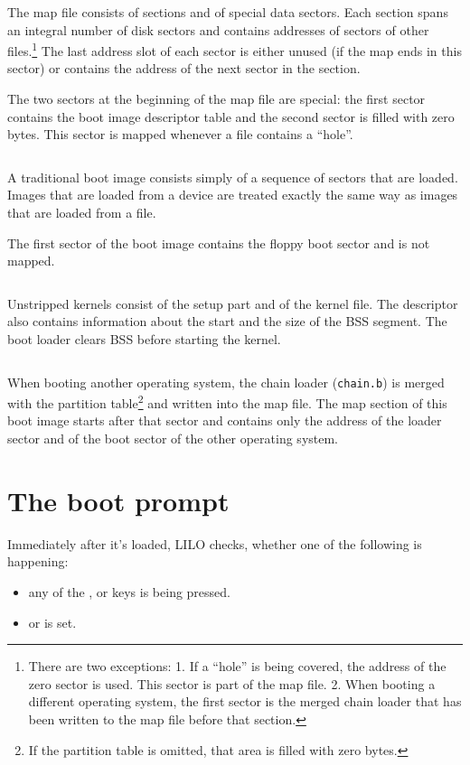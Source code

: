 $$
  
$$

The map file consists of sections and of special data sectors. Each section
spans an integral number of disk sectors and contains addresses of sectors
of other files.\footnote{There are two exceptions: 1. If a ``hole'' is being
covered, the address of the zero sector is used. This sector is part of the
map file. 2. When booting a different operating system, the first sector is
the merged chain loader that has been written to the map file before that
section.} The last address slot of each sector is either unused (if the map
ends in this sector) or contains the address of the next sector in the
section.

The two sectors at the beginning of the map file are special: the first
sector contains the boot image descriptor table and the second sector
is filled with zero bytes. This sector is mapped whenever a file contains
a ``hole''.

$$
  
$$

A traditional boot image consists simply of a sequence of sectors that are
loaded. Images that are loaded from a device are treated exactly the same
way as images that are loaded from a file.

The first sector of the boot image contains the floppy boot sector
and is not mapped.

$$
  
$$

Unstripped kernels consist of the setup part and of the kernel file. The
descriptor also contains information about the start and the size of the
BSS segment. The boot loader clears BSS before starting the kernel.

$$
  
$$

When booting another operating system, the chain loader ({\tt chain.b}) is
merged with the partition table\footnote{If the partition table is omitted,
that area is filled with zero bytes.} and written into the map file. The
map section of this boot image starts after that sector and contains only
the address of the loader sector and of the boot sector of the other
operating system.


\section{The boot prompt}

Immediately after it's loaded, LILO checks, whether one of the following
is happening:

\begin{itemize}
  \item any of the ,  or  keys is being
    pressed.
  \item {} or  is set.
\end{itemize}

